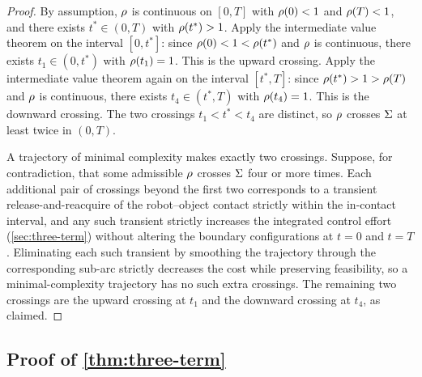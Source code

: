 \begin{proof}
By assumption, $\rho$ is continuous on $[0, T]$ with
$\rho(0) < 1$ and $\rho(T) < 1$, and there exists
$t^{*} \in (0, T)$ with $\rho(t^{*}) > 1$. Apply the
intermediate value theorem \citep{Rudin1976} on the interval
$[0, t^{*}]$: since $\rho(0) < 1 < \rho(t^{*})$ and
$\rho$ is continuous, there exists $t_{1} \in (0, t^{*})$
with $\rho(t_{1}) = 1$. This is the upward crossing.
Apply the intermediate value theorem again on the interval
$[t^{*}, T]$: since $\rho(t^{*}) > 1 > \rho(T)$ and
$\rho$ is continuous, there exists $t_{4} \in (t^{*}, T)$
with $\rho(t_{4}) = 1$. This is the downward crossing.
The two crossings $t_{1} < t^{*} < t_{4}$ are distinct, so
$\rho$ crosses $\Sigma$ at least twice in $(0, T)$.

A trajectory of minimal complexity makes exactly two crossings.
Suppose, for contradiction, that some admissible $\rho$
crosses $\Sigma$ four or more times. Each additional pair of
crossings beyond the first two corresponds to a transient
release-and-reacquire of the robot--object contact strictly
within the in-contact interval, and any such transient
strictly increases the integrated control effort
(\cref{sec:three-term}) without altering the boundary
configurations at $t = 0$ and $t = T$. Eliminating each such
transient by smoothing the trajectory through the corresponding
sub-arc strictly decreases the cost while preserving
feasibility, so a minimal-complexity trajectory has no such
extra crossings. The remaining two crossings are the upward
crossing at $t_{1}$ and the downward crossing at $t_{4}$, as
claimed.
\end{proof}

\subsection{Proof of \cref{thm:three-term}}
\label{app:proof:three-term}

